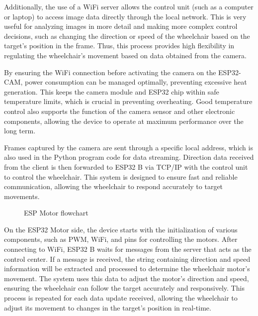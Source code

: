 Additionally, the use of a WiFi server allows the control unit (such as a computer or laptop) to access image data directly through the local network. This is very useful for analyzing images in more detail and making more complex control decisions, such as changing the direction or speed of the wheelchair based on the target's position in the frame. Thus, this process provides high flexibility in regulating the wheelchair's movement based on data obtained from the camera.

By ensuring the WiFi connection before activating the camera on the ESP32-CAM, power consumption can be managed optimally, preventing excessive heat generation. This keeps the camera module and ESP32 chip within safe temperature limits, which is crucial in preventing overheating. Good temperature control also supports the function of the camera sensor and other electronic components, allowing the device to operate at maximum performance over the long term.

Frames captured by the camera are sent through a specific local address, which is also used in the Python program code for data streaming. Direction data received from the client is then forwarded to ESP32 B via TCP/IP with the control unit to control the wheelchair. This system is designed to ensure fast and reliable communication, allowing the wheelchair to respond accurately to target movements.

\begin{figure}[H]
  \centering
  \resizebox{1\linewidth}{!}{
    
  }
  \caption{ESP Motor flowchart}
\end{figure}

On the ESP32 Motor side, the device starts with the initialization of various components, such as PWM, WiFi, and pins for controlling the motors. After connecting to WiFi, ESP32 B waits for messages from the server that acts as the control center. If a message is received, the string containing direction and speed information will be extracted and processed to determine the wheelchair motor's movement. The system uses this data to adjust the motor's direction and speed, ensuring the wheelchair can follow the target accurately and responsively. This process is repeated for each data update received, allowing the wheelchair to adjust its movement to changes in the target's position in real-time.